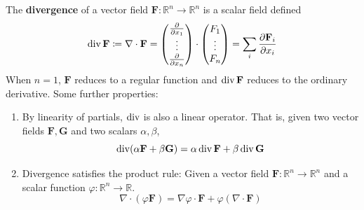   \begin{definition}[Divergence]
  The \textbf{divergence} of a vector field $\mathbf{F}: \mathbb{R}^n \longrightarrow \mathbb{R}^n$ is a scalar field defined 
  \[\operatorname{div} \mathbf{F} \coloneqq \nabla \cdot \mathbf{F} = \begin{pmatrix} \frac{\partial}{\partial x_1} \\ \vdots \\ \frac{\partial}{\partial x_n} \end{pmatrix} \cdot \begin{pmatrix} F_1 \\ \vdots \\ F_n \end{pmatrix} = \sum_i \frac{\partial \mathbf{F}_i}{\partial x_i}\]
  When $n = 1$, $\mathbf{F}$ reduces to a regular function and $\operatorname{div} \mathbf{F} $ reduces to the ordinary derivative. Some further properties: 
  \begin{enumerate}
      \item By linearity of partials, $\operatorname{div}$ is also a linear operator. That is, given two vector fields $\mathbf{F}, \mathbf{G}$ and two scalars $\alpha, \beta$, 
      \[\operatorname{div} (\alpha \mathbf{F} + \beta \mathbf{G}) = \alpha \operatorname{div} \mathbf{F} + \beta \operatorname{div} \mathbf{G}\]
      
      \item Divergence satisfies the product rule: Given a vector field $\mathbf{F}: \mathbb{R}^n \longrightarrow \mathbb{R}^n$ and a scalar function $\varphi: \mathbb{R}^n \longrightarrow \mathbb{R}$. 
      \[\nabla \cdot (\varphi \mathbf{F}) = \nabla \varphi \cdot \mathbf{F} + \varphi (\nabla \cdot \mathbf{F})\]
  \end{enumerate}
  \end{definition}

